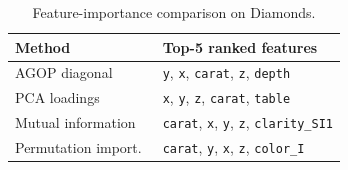 \begin{table}[H]
  \centering
  \caption{Feature-importance comparison on Diamonds.}
  \label{tab:diamonds-feature-importance}
  \small
  \begin{tabular}{ll}
    \toprule
    Method & Top-5 ranked features \\
    \midrule
    AGOP diagonal        & \texttt{y}, \texttt{x}, \texttt{carat}, \texttt{z}, \texttt{depth} \\
    PCA loadings         & \texttt{x}, \texttt{y}, \texttt{z}, \texttt{carat}, \texttt{table} \\
    Mutual information   & \texttt{carat}, \texttt{x}, \texttt{y}, \texttt{z}, \texttt{clarity\_SI1} \\
    Permutation import.\ & \texttt{carat}, \texttt{y}, \texttt{x}, \texttt{z}, \texttt{color\_I} \\
    \bottomrule
  \end{tabular}
\end{table}
